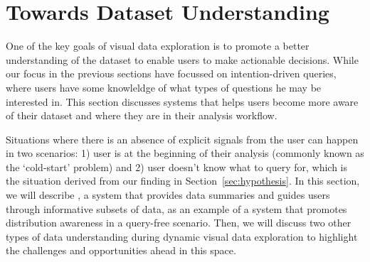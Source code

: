 \section{Towards Dataset Understanding\label{sec:understanding}}
\par One of the key goals of visual data exploration is to promote a better understanding of the dataset to enable users to make actionable decisions. While our focus in the previous sections have focussed on intention-driven queries, where users have some knowleldge of what types of questions he may be interested in. This section discusses systems that helps users become more aware of their dataset and where they are in their analysis workflow. %
\par Situations where there is an absence of explicit signals from the user can happen in two scenarios: 1) user is at the beginning of their analysis (commonly known as the `cold-start' problem) and 2) user doesn't know what to query for, which is the situation derived from our \zv finding in Section~\ref{sec:hypothesis}. In this section, we will describe \sbd, a system that provides data summaries and guides users through informative subsets of data, as an example of a system that promotes distribution awareness in a query-free scenario. Then, we will discuss two other types of data understanding during dynamic visual data exploration to highlight the challenges and opportunities ahead in this space.
